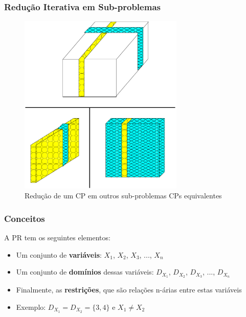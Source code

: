 \begin{frame}[fragile]

\frametitle{Redução Iterativa em Sub-problemas}

\begin{figure}[!htb]

\begin{center}
\includegraphics[width=0.70\textwidth, height=0.60\textheight]{figures/reducao_PR_02.pdf}
\caption{Redução de um CP em outros sub-problemas CPs equivalentes}
\end{center}
\end{figure}

    
\end{frame}


\begin{frame}[fragile]
\frametitle{Conceitos}

\begin{block}{A PR tem os seguintes elementos:}
    \pause
    \begin{itemize}
    \item Um conjunto de \textbf{variáveis}: $X_1$, $X_2$, $X_3$, ..., $X_n$ 

    \pause
    \item Um conjunto de \textbf{domínios} dessas variáveis: $D_{X_1}$, $D_{X_2}$, $D_{X_3}$, ..., $D_{X_n}$

    \pause
    \item Finalmente, as \textbf{restrições}, que são relações n-árias entre estas variáveis

     \pause
    \item Exemplo: $D_{X_1} = D_{X_2}= \{3,4\}$ e $X_1 \neq X_2$

\end{itemize}

\end{block}
    
\end{frame}

